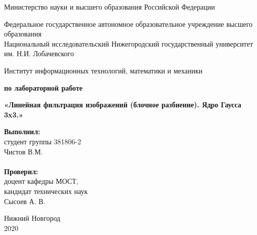 \documentclass{report}
\begin{document}
\begin{titlepage}

\begin{center}
Министерство науки и высшего образования Российской Федерации
\end{center}

\begin{center}
Федеральное государственное автономное образовательное учреждение высшего образования \\
Национальный исследовательский Нижегородский государственный университет им. Н.И. Лобачевского
\end{center}

\begin{center}
Институт информационных технологий, математики и механики
\end{center}

\vspace{4em}

\begin{center}
\textbf{ по лабораторной работе} \\
\end{center}
\begin{center}
\textbf{\Large«Линейная фильтрация изображений (блочное разбиение). Ядро Гаусса 3x3.»} \\
\end{center}

\vspace{4em}

\newbox{\lbox}
\newlength{\maxl}
\setlength{\maxl}{\wd\lbox}
\hfill\parbox{7cm}{
\hspace*{5cm}\hspace*{-5cm}\textbf{Выполнил:} \\ студент группы 381806-2 \\ Чистов В.М.\\
\\
\hspace*{5cm}\hspace*{-5cm}\textbf{Проверил:}\\ доцент кафедры МОСТ, \\ кандидат технических наук \\ Сысоев А. В.\\
}
\vspace{\fill}

\begin{center} Нижний Новгород \\ 2020 \end{center}

\end{titlepage}
\end{document}
